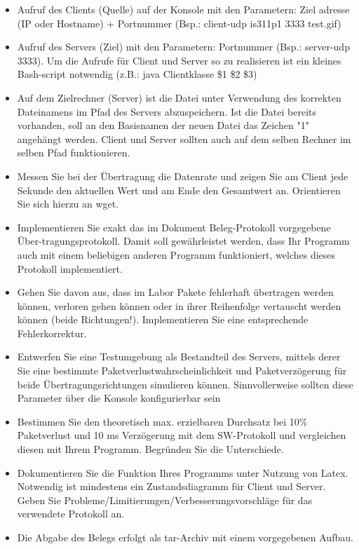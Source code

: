 \documentclass[12pt]{article}
\begin{document}
\begin{itemize}

\item Aufruf des Clients (Quelle) auf der Konsole mit den Parametern: Ziel
adresse (IP oder Hostname) + Portnummer (Bsp.: client-udp is311p1 3333 test.gif)

\item Aufruf des Servers (Ziel) mit den Parametern: Portnummer (Bsp.: server-udp 3333). Um die Aufrufe für Client und Server so zu realisieren ist ein kleines Bash-script notwendig (z.B.: java Clientklasse \$1 \$2 \$3)

\item Auf dem Zielrechner (Server) ist die Datei unter Verwendung des korrekten Dateinamens im Pfad des Servers abzuspeichern. Ist die Datei bereits vorhanden, soll an den Basisnamen der neuen Datei das Zeichen "1" angehängt werden. Client und Server sollten auch auf dem selben Rechner im selben Pfad funktionieren.

\item Messen Sie bei der Übertragung die Datenrate und zeigen Sie am Client jede Sekunde den aktuellen Wert und am Ende den Gesamtwert an. Orientieren Sie sich hierzu an wget.

\item Implementieren Sie exakt das im Dokument Beleg-Protokoll vorgegebene Über-tragungsprotokoll. Damit soll gewährleistet werden, dass Ihr Programm auch mit einem beliebigen anderen Programm funktioniert, welches dieses Protokoll implementiert.

\item Gehen Sie davon aus, dass im Labor Pakete fehlerhaft übertragen werden können, verloren gehen können oder in ihrer Reihenfolge vertauscht werden können (beide Richtungen!). Implementieren Sie eine entsprechende Fehlerkorrektur.

\item Entwerfen Sie eine Testumgebung als Bestandteil des Servers, mittels derer Sie eine bestimmte Paketverlustwahrscheinlichkeit und Paketverzögerung für beide Übertragungsrichtungen simulieren können. Sinnvollerweise sollten diese Parameter über die Konsole konfigurierbar sein

\item Bestimmen Sie den theoretisch max. erzielbaren Durchsatz bei 10\% Paketverlust und 10 ms Verzögerung mit dem SW-Protokoll und vergleichen diesen mit Ihrem Programm. Begründen Sie die Unterschiede.

\item Dokumentieren Sie die Funktion Ihres Programms unter Nutzung von Latex. Notwendig ist mindestens ein Zustandsdiagramm für Client und Server. Geben Sie Probleme/Limitierungen/Verbesserungsvorschläge für das verwendete Protokoll an.

\item Die Abgabe des Belegs erfolgt als tar-Archiv mit einem vorgegebenen Aufbau.

\end{itemize}
\end{document}
